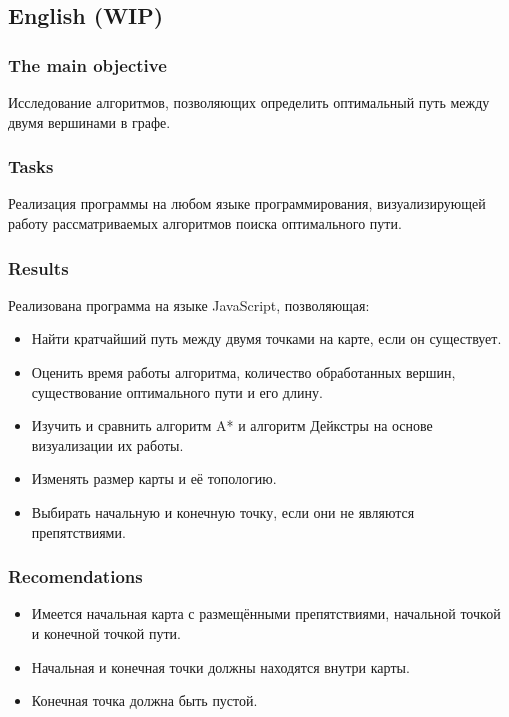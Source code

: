 \subsection{English (WIP)}

\subsubsection{The main objective}
Исследование алгоритмов, позволяющих определить оптимальный путь между двумя вершинами в графе.

\subsubsection{Tasks}
Реализация программы на любом языке программирования, визуализирующей работу рассматриваемых алгоритмов поиска оптимального пути.

\subsubsection{Results}
Реализована программа на языке JavaScript, позволяющая:
\begin{itemize}
  \item Найти кратчайший путь между двумя точками на карте, если он существует.
  \item Оценить время работы алгоритма, количество обработанных вершин, существование оптимального пути и его длину.
  \item Изучить и сравнить алгоритм A* и алгоритм Дейкстры на основе визуализации их работы.
  \item Изменять размер карты и её топологию.
  \item Выбирать начальную и конечную точку, если они не являются препятствиями.
\end{itemize}

\subsubsection{Recomendations}
\begin{itemize}
  \item Имеется начальная карта с размещёнными препятствиями, начальной точкой и конечной точкой пути.
  \item Начальная и конечная точки должны находятся внутри карты.
  \item Конечная точка должна быть пустой.
\end{itemize}